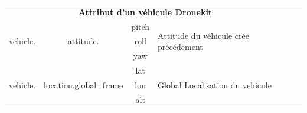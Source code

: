 \documentclass[a4paper, 10pt]{article}
\begin{document}
\begin{enumerate}
\begin{table}[]
\begin{tabular}{lcllll}
\end{tabular}
\end{table} 
\begin{table}[]
\begin{tabular}{lcllll}
\multicolumn{4}{c}{\textbf{Attribut d'un véhicule Dronekit}}                                                                                                                                                                                                                                                              &                       &  \\ \cline{1-5}
\multirow{3}{*}{vehicle.}                 & \multirow{3}{*}{attitude.}                                                                                          & \multicolumn{1}{c}{pitch}                                                                      & \multirow{3}{*}{Attitude du véhicule crée précédement} &                       &  \\
                                          &                                                                                                                     & \multicolumn{1}{c}{roll}                                                                       &                                                        &                       &  \\
                                          &                                                                                                                     & \multicolumn{1}{c}{yaw}                                                                        &                                                        &                       &  \\ \cline{1-5}
\multirow{3}{*}{vehicle.}                 & \multirow{3}{*}{location.global\_frame}                                                                             & \multicolumn{1}{c}{lat}                                                                        & \multirow{3}{*}{Global Localisation du vehicule}       &                       &  \\
                                          &                                                                                                                     & \multicolumn{1}{c}{lon}                                                                        &                                                        &                       &  \\
                                          &                                                                                                                     & \multicolumn{1}{c}{alt}                                                                        &                                                        &                       &  \\ \cline{1-5}

\end{tabular}
\end{table}
\end{enumerate}
\end{document}
